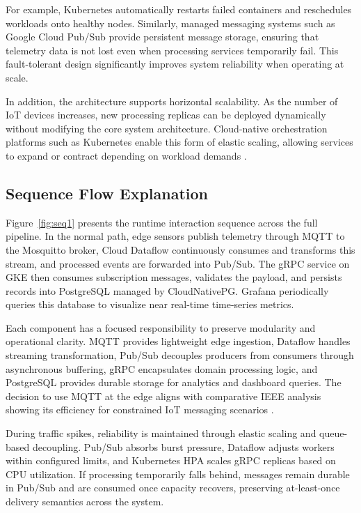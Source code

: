 \documentclass[conference]{IEEEtran}
\begin{document}
For example, Kubernetes automatically restarts failed containers and reschedules workloads onto healthy nodes. Similarly, managed messaging systems such as Google Cloud Pub/Sub provide persistent message storage, ensuring that telemetry data is not lost even when processing services temporarily fail. This fault-tolerant design significantly improves system reliability when operating at scale.

In addition, the architecture supports horizontal scalability. As the number of IoT devices increases, new processing replicas can be deployed dynamically without modifying the core system architecture. Cloud-native orchestration platforms such as Kubernetes enable this form of elastic scaling, allowing services to expand or contract depending on workload demands \cite{kubernetes2018}.
\subsection{Sequence Flow Explanation}
Figure~\ref{fig:seq1} presents the runtime interaction sequence across the full pipeline. In the normal path, edge sensors publish telemetry through MQTT to the Mosquitto broker, Cloud Dataflow continuously consumes and transforms this stream, and processed events are forwarded into Pub/Sub. The gRPC service on GKE then consumes subscription messages, validates the payload, and persists records into PostgreSQL managed by CloudNativePG. Grafana periodically queries this database to visualize near real-time time-series metrics.

Each component has a focused responsibility to preserve modularity and operational clarity. MQTT provides lightweight edge ingestion, Dataflow handles streaming transformation, Pub/Sub decouples producers from consumers through asynchronous buffering, gRPC encapsulates domain processing logic, and PostgreSQL provides durable storage for analytics and dashboard queries. The decision to use MQTT at the edge aligns with comparative IEEE analysis showing its efficiency for constrained IoT messaging scenarios \cite{naik2017protocols}.

During traffic spikes, reliability is maintained through elastic scaling and queue-based decoupling. Pub/Sub absorbs burst pressure, Dataflow adjusts workers within configured limits, and Kubernetes HPA scales gRPC replicas based on CPU utilization. If processing temporarily falls behind, messages remain durable in Pub/Sub and are consumed once capacity recovers, preserving at-least-once delivery semantics across the system.
\end{document}
